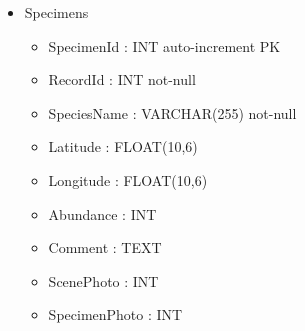\begin{itemize}
            \item Specimens
            \begin{itemize}
                \item SpecimenId : INT auto-increment PK
                \item RecordId : INT not-null
                \item SpeciesName : VARCHAR(255) not-null
                \item Latitude : FLOAT(10,6)
                \item Longitude : FLOAT(10,6)
                \item Abundance : INT
                \item Comment : TEXT
                \item ScenePhoto : INT
                \item SpecimenPhoto : INT   
            \end{itemize}
            \end{itemize}